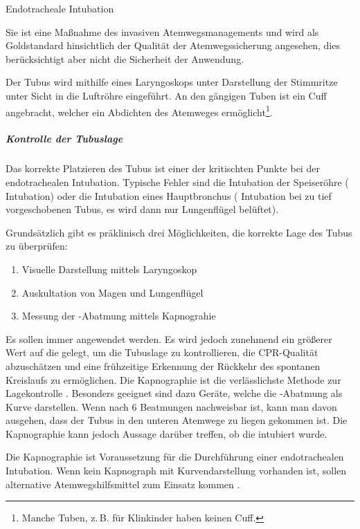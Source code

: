 \TextSlidePicture
{Endotracheale Intubation}%
{%
 Sie ist eine Maßnahme des invasiven
Atemwegsmanagements und wird als Goldstandard hinsichtlich
der Qualität der Atemwegssicherung angesehen, dies
berücksichtigt aber nicht die Sicherheit der Anwendung.

Der Tubus wird mithilfe eines Laryngoskops unter Darstellung
der Stimmritze unter Sicht in die Luftröhre eingeführt.
An den gängigen Tuben ist ein Cuff angebracht, welcher ein
Abdichten des Atemweges ermöglicht\footnote{Manche Tuben,
z.\,B. für Klinkinder haben keinen Cuff.}.

\subparagraph{Kontrolle der Tubuslage}
Das korrekte Platzieren des Tubus ist einer der kritischten
Punkte bei der endotrachealen Intubation. Typische Fehler
sind die Intubation der Speiseröhre (
Intubation) oder die Intubation eines Hauptbronchus
( Intubation bei zu tief vorgeschobenen Tubus, 
es wird dann nur  Lungenflügel belüftet).

Grundsätzlich gibt es präklinisch drei Möglichkeiten, die
korrekte Lage des Tubus zu überprüfen:
\begin{enumerate}
  \item Visuelle Darstellung mittels Laryngoskop
  \item Auskultation von Magen und Lungenflügel
  \item Messung der -Abatmung mittels Kapnograhie
\end{enumerate}
Es sollen immer  angewendet werden.
Es wird jedoch zunehmend ein größerer Wert auf die
 gelegt, um die Tubuslage zu kontrollieren,
die CPR-Qualität abzuschätzen und eine frühzeitige Erkennung
der Rückkehr des spontanen Kreislaufs zu ermöglichen. Die
Kapnographie ist die verlässlichste Methode zur
Lagekontrolle \cite{Grmec2002}. Besonders
geeignet sind dazu Geräte, welche die -Abatmung als Kurve darstellen. Wenn nach 6
Beatmungen  nachweisbar ist, kann man davon
ausgehen, dass der Tubus in den unteren Atemwege zu liegen
gekommen ist. Die Kapnographie kann jedoch  Aussage
darüber treffen, ob die  intubiert wurde.

Die Kapnographie ist Voraussetzung 
für die Durchführung einer endotrachealen Intubation. 
Wenn kein Kapnograph mit Kurvendarstellung vorhanden ist, 
sollen alternative Atemwegshilfsmittel zum Einsatz kommen
%
.
}%
